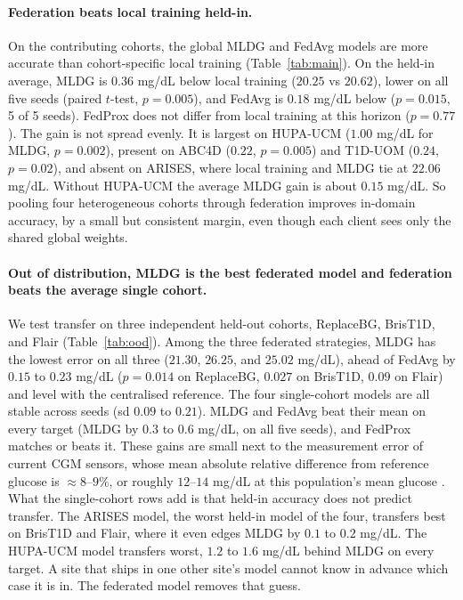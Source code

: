 \documentclass[10pt,letterpaper]{article}
\begin{document}
\paragraph{Federation beats local training held-in.} On the contributing
cohorts, the global MLDG and FedAvg models are more accurate than
cohort-specific local training (Table~\ref{tab:main}). On the held-in average,
MLDG is $0.36$ mg/dL below local training ($20.25$ vs $20.62$), lower on all
five seeds (paired $t$-test, $p = 0.005$), and FedAvg is $0.18$ mg/dL below
($p = 0.015$, 5 of 5 seeds). FedProx does not differ from local training at
this horizon ($p = 0.77$). The gain is not spread evenly. It is largest on
HUPA-UCM ($1.00$ mg/dL for MLDG, $p = 0.002$), present on ABC4D ($0.22$,
$p = 0.005$) and T1D-UOM ($0.24$, $p = 0.02$), and absent on ARISES, where
local training and MLDG tie at $22.06$ mg/dL. Without HUPA-UCM the average
MLDG gain is about $0.15$ mg/dL. So pooling four heterogeneous cohorts
through federation improves in-domain accuracy, by a small but consistent
margin, even though each client sees only the shared global weights.

\paragraph{Out of distribution, MLDG is the best federated model and
federation beats the average single cohort.} We test transfer on three
independent held-out cohorts, ReplaceBG, BrisT1D, and Flair
(Table~\ref{tab:ood}). Among the three federated strategies, MLDG has the
lowest error on all three ($21.30$, $26.25$, and $25.02$ mg/dL), ahead of
FedAvg by $0.15$ to $0.23$ mg/dL ($p = 0.014$ on ReplaceBG, $0.027$ on
BrisT1D, $0.09$ on Flair) and level with the centralised reference. The four
single-cohort models are all stable across seeds (sd $0.09$ to $0.21$). MLDG
and FedAvg beat their mean on every target (MLDG by $0.3$ to $0.6$ mg/dL, on
all five seeds), and FedProx matches or beats it. These gains are small next to the measurement error of current CGM
sensors, whose mean absolute relative difference from reference glucose is
$\approx 8$--$9\%$, or roughly $12$--$14$ mg/dL at this population's mean
glucose \cite{garg2022dexcomg7,alva2023libre3}. What the single-cohort rows
add is that held-in accuracy does not predict transfer. The ARISES model, the
worst held-in model of the four, transfers best on BrisT1D and Flair, where it
even edges MLDG by $0.1$ to $0.2$ mg/dL. The HUPA-UCM model transfers worst,
$1.2$ to $1.6$ mg/dL behind MLDG on every target. A
site that ships in one other site's model cannot know in advance which case
it is in. The federated model removes that guess.
\end{document}
